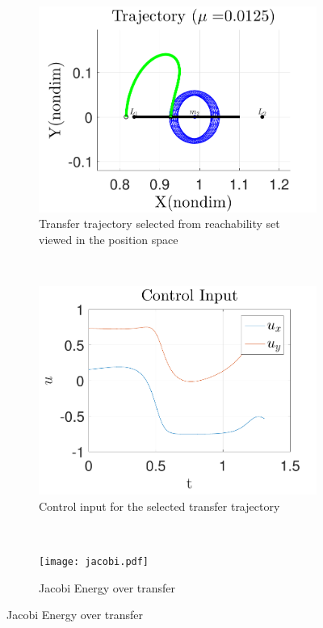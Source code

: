 \documentclass[smallcondensed]{svjour3}
\begin{document}
\begin{figure}
        \begin{subfigure}[htbp]{0.5\textwidth} 
                \includegraphics[width=\textwidth]{reach_transfer} 
                \caption{Transfer trajectory selected from reachability set viewed in the position space} \label{fig:reach_transfer} 
        \end{subfigure}~ 
        \begin{subfigure}[htbp]{0.5\textwidth} 
                \includegraphics[width=\textwidth]{control_input_l1} 
                \caption{Control input for the selected transfer trajectory} \label{fig:control_l1} 
        \end{subfigure}~

        \begin{subfigure}[htbp]{0.5\textwidth} 
            \texttt{[image: jacobi.pdf]} 
            \caption{Jacobi Energy over transfer \label{fig:jacobi_l1}} 
        \end{subfigure} 


\end{figure}
\end{document}
